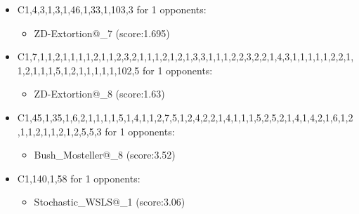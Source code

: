 \begin{appendices}
\begin{itemize}
        \item C1,4,3,1,3,1,46,1,33,1,103,3 for 1 opponents:
        \begin{multicols}{3}
            \begin{itemize}
                \item ZD-Extortion@\_7 (score:1.695)
            \end{itemize}
        \end{multicols}

        \item C1,7,1,1,2,1,1,1,1,2,1,1,2,3,2,1,1,1,2,1,2,1,3,3,1,1,1,2,2,3,2,2,1,4,3,1,1,1,1,1,2,2,1,1,2,1,1,1,5,1,2,1,1,1,1,1,102,5 for 1 opponents:
        \begin{multicols}{3}
            \begin{itemize}
                \item ZD-Extortion@\_8 (score:1.63)
            \end{itemize}
        \end{multicols}

        \item C1,45,1,35,1,6,2,1,1,1,1,5,1,4,1,1,2,7,5,1,2,4,2,2,1,4,1,1,1,5,2,5,2,1,4,1,4,2,1,6,1,2,1,1,2,1,1,2,1,2,5,5,3 for 1 opponents:
        \begin{multicols}{3}
            \begin{itemize}
                \item Bush\_Mosteller@\_8 (score:3.52)
            \end{itemize}
        \end{multicols}

        \item C1,140,1,58 for 1 opponents:
        \begin{multicols}{3}
            \begin{itemize}
                \item Stochastic\_WSLS@\_1 (score:3.06)
            \end{itemize}
        \end{multicols}


\end{itemize}
\end{appendices}
